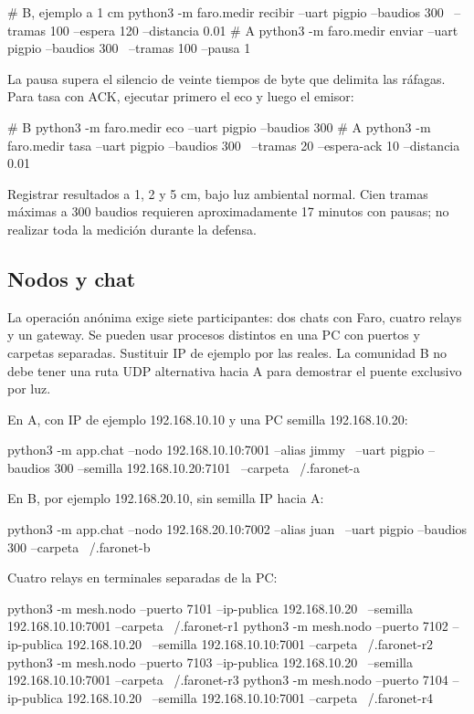 \documentclass[11pt,letterpaper]{article}
\begin{document}
\begin{codigo}
# B, ejemplo a 1 cm
python3 -m faro.medir recibir --uart pigpio --baudios 300 \
  --tramas 100 --espera 120 --distancia 0.01
# A
python3 -m faro.medir enviar --uart pigpio --baudios 300 \
  --tramas 100 --pausa 1
\end{codigo}

La pausa supera el silencio de veinte tiempos de byte que delimita las ráfagas.
Para tasa con ACK, ejecutar primero el eco y luego el emisor:

\begin{codigo}
# B
python3 -m faro.medir eco --uart pigpio --baudios 300
# A
python3 -m faro.medir tasa --uart pigpio --baudios 300 \
  --tramas 20 --espera-ack 10 --distancia 0.01
\end{codigo}

Registrar resultados a 1, 2 y 5 cm, bajo luz ambiental normal. Cien tramas máximas
a 300 baudios requieren aproximadamente 17 minutos con pausas; no realizar toda
la medición durante la defensa.

\subsection{Nodos y chat}

La operación anónima exige siete participantes: dos chats con Faro, cuatro relays
y un gateway. Se pueden usar procesos distintos en una PC con puertos y carpetas
separadas. Sustituir IP de ejemplo por las reales. La comunidad B no debe tener
una ruta UDP alternativa hacia A para demostrar el puente exclusivo por luz.

En A, con IP de ejemplo 192.168.10.10 y una PC semilla 192.168.10.20:

\begin{codigo}
python3 -m app.chat --nodo 192.168.10.10:7001 --alias jimmy \
  --uart pigpio --baudios 300 --semilla 192.168.10.20:7101 \
  --carpeta ~/.faronet-a
\end{codigo}

En B, por ejemplo 192.168.20.10, sin semilla IP hacia A:

\begin{codigo}
python3 -m app.chat --nodo 192.168.20.10:7002 --alias juan \
  --uart pigpio --baudios 300 --carpeta ~/.faronet-b
\end{codigo}

Cuatro relays en terminales separadas de la PC:

\begin{codigo}
python3 -m mesh.nodo --puerto 7101 --ip-publica 192.168.10.20 \
  --semilla 192.168.10.10:7001 --carpeta ~/.faronet-r1
python3 -m mesh.nodo --puerto 7102 --ip-publica 192.168.10.20 \
  --semilla 192.168.10.10:7001 --carpeta ~/.faronet-r2
python3 -m mesh.nodo --puerto 7103 --ip-publica 192.168.10.20 \
  --semilla 192.168.10.10:7001 --carpeta ~/.faronet-r3
python3 -m mesh.nodo --puerto 7104 --ip-publica 192.168.10.20 \
  --semilla 192.168.10.10:7001 --carpeta ~/.faronet-r4
\end{codigo}
\end{document}
